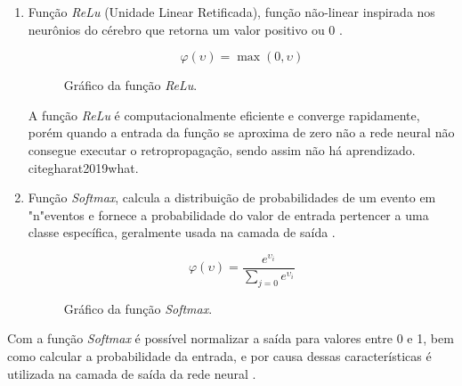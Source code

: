 \begin{enumerate}
	\item Função \textit{ReLu} (Unidade Linear Retificada), função não-linear inspirada nos neurônios do cérebro que retorna um valor positivo ou 0 \cite{rizzo2020inteligencia}.
	\begin{figure}[H]
	\caption{Gráfico da função \textit{ReLu}.}
	\begin{center}
		\begin{minipage}{0.45\textwidth}
			\begin{equation}
				\varphi(\upsilon) = \max(0,\upsilon)
			\end{equation}
		\end{minipage}
		\hfill
		\begin{minipage}{0.45\textwidth}
		\end{minipage}
	\end{center}
	\label{fig:grafico_relu}
	\end{figure}
	A função \textit{ReLu} é computacionalmente eficiente e converge rapidamente, porém quando a entrada da função se aproxima de zero não a rede neural não consegue executar o retropropagação, sendo assim não há aprendizado. cite{gharat2019what}.

	\item Função \textit{Softmax}, calcula a distribuição de probabilidades de um evento em "n"\space eventos e fornece a probabilidade do valor de entrada pertencer a uma classe específica, geralmente usada na camada de saída \cite{gharat2019what}.
	\begin{figure}[H]
	\caption{Gráfico da função \textit{Softmax}.}
	\begin{center}
		\begin{minipage}{0.45\textwidth}
			\begin{equation}
				\varphi(\upsilon) = \frac{e^{\upsilon_i}}{\sum_{j=0} e^{\upsilon_i}}
			\end{equation}
		\end{minipage}
		\hfill
		\begin{minipage}{0.45\textwidth}
		\end{minipage}
	\end{center}
	\label{fig:grafico_softmax}
	\end{figure}
\end{enumerate}

Com a função \textit{Softmax} é possível normalizar a saída para valores entre 0 e 1, bem como calcular a probabilidade da entrada, e por causa dessas características é utilizada na camada de saída da rede neural \cite{gharat2019what}.

